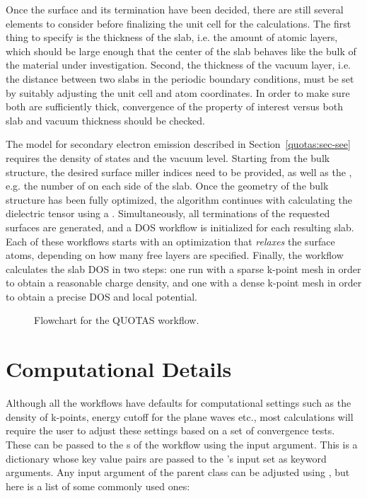 \begin{refsection}
Once the surface and its termination have been decided, there are still 
several elements to consider before finalizing the unit cell for the 
calculations. The first thing to specify is the thickness of the slab, i.e. 
the amount of atomic layers, which should be large enough that the center of 
the slab behaves like the bulk of the material under investigation. Second, 
the thickness of the vacuum layer, i.e. the distance between two slabs in the 
periodic boundary conditions, must be set by suitably adjusting the unit cell 
and atom coordinates. In order to make sure both are sufficiently thick, 
convergence of the property of interest versus both slab and vacuum thickness 
should be checked. 
 
The model for secondary electron emission described in 
Section~\ref{quotas:sec-see} requires the density of states and the vacuum level. 
Starting from the bulk structure, the desired surface miller indices need to 
be provided, as well as the , e.g. the number of 
 on each side of the slab. Once the geometry of the bulk 
structure has been fully optimized, the algorithm continues with calculating 
the dielectric tensor using a . Simultaneously, all 
terminations of the requested surfaces are generated, and a DOS workflow is 
initialized for each resulting slab. Each of these workflows starts with an 
optimization that \textit{relaxes} the surface atoms, depending on how many 
free layers are specified. Finally, the workflow calculates the slab DOS in 
two steps: one run with a sparse k-point mesh in order to obtain a reasonable 
charge density, and one with a dense k-point mesh in order to obtain a precise 
DOS and local potential. 
 
\begin{figure}[ht] 
 
\caption{\label{automation:fig-quotas} Flowchart for the QUOTAS workflow.} 
\end{figure} 
 
\section{\label{automation:sec-computational}Computational Details} 
 
Although all the workflows have defaults for computational settings such as 
the density of k-points, energy cutoff for the plane waves etc., most 
calculations will require the user to adjust these settings based on a set of 
convergence tests. These can be passed to the s of the workflow 
using the  input argument. This is a dictionary 
whose key value pairs are passed to the 
's input 
set as keyword arguments. Any input argument of the parent  
class can be adjusted using , but here is a list of 
some commonly used ones: 
 

\end{refsection}
